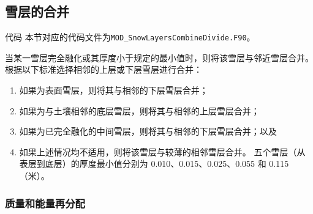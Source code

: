 \subsection{雪层的合并}
\begin{mymdframed}{代码}
本节对应的代码文件为\texttt{MOD\_SnowLayersCombineDivide.F90}。
\end{mymdframed}

当某一雪层完全融化或其厚度小于规定的最小值时，则将该雪层与邻近雪层合并。根据以下标准选择相邻的上层或下层雪层进行合并：
\begin{enumerate}
\item 如果为表面雪层，则将其与相邻的下层雪层合并；
\item 如果为与土壤相邻的底层雪层，则将其与相邻的上层雪层合并；
\item 如果为已完全融化的中间雪层，则将其与相邻的下层雪层合并；以及
\item 如果上述情况均不适用，则将该雪层与较薄的相邻雪层合并。
五个雪层（从表层到底层）的厚度最小值分别为 0.010、0.015、0.025、0.055 和 0.115（米）。

\end{enumerate}


\subsubsection{质量和能量再分配}

